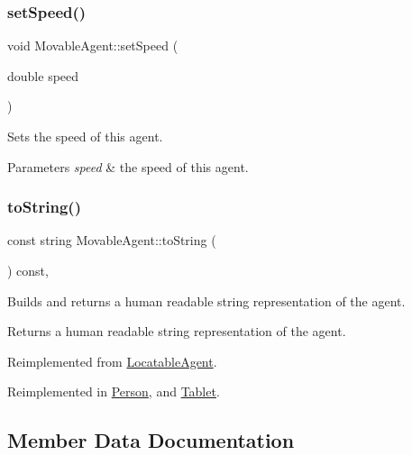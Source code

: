 \mbox{\label{class_movable_agent_ae2ef452e81789a4370e7dee32a9cc67e}} 
\subsubsection{\texorpdfstring{set\+Speed()}{setSpeed()}}
{\footnotesize\ttfamily void Movable\+Agent\+::set\+Speed (\begin{DoxyParamCaption}\item[{double}]{speed }\end{DoxyParamCaption})}

Sets the speed of this agent. 
\begin{DoxyParams}{Parameters}
{\em speed} & the speed of this agent. \\
\hline
\end{DoxyParams}
\mbox{\label{class_movable_agent_a1dee2a6bf93f01006fadfb6fba6c9a59}} 
\subsubsection{\texorpdfstring{to\+String()}{toString()}}
{\footnotesize\ttfamily const string Movable\+Agent\+::to\+String (\begin{DoxyParamCaption}{ }\end{DoxyParamCaption}) const\hspace{0.3cm}{\ttfamily [override]}, {\ttfamily [virtual]}}

Builds and returns a human readable string representation of the agent. \begin{DoxyReturn}{Returns}
a human readable string representation of the agent. 
\end{DoxyReturn}


Reimplemented from \hyperlink{class_locatable_agent_a88674f4c8ab9b1b2f3986b226bf4244f}{Locatable\+Agent}.



Reimplemented in \hyperlink{class_person_a68872538da519d0a04297f43376db27c}{Person}, and \hyperlink{class_tablet_a3fae01e7d526699476221c6a686a4fba}{Tablet}.



\subsection{Member Data Documentation}
\mbox{\label{class_movable_agent_ac725b42e7b968740a59c3e1033d69ac5}} 
